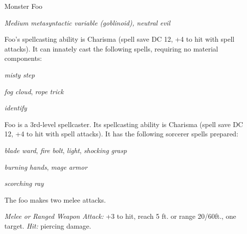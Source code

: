\documentclass[10pt,twoside,twocolumn,openany,bg=full,nomultitoc]{dndbook}
\begin{document}
\begin{monsterbox}{Monster Foo}
\begin{hangingpar}
\textit{Medium metasyntactic variable (goblinoid), neutral evil}
\end{hangingpar}
\dndline%
\basics[%
armorclass = 9 (12 with \emph{mage armor}),
hitpoints = \dice{3d8+3},
speed = {30 ft., fly 30 ft.},
]
\dndline%
\stats[%
CON = \stat{13},
STR = \stat{12},
DEX = \stat{8},
INT = \stat{10},
WIS = \stat{14},
CHA = \stat{15},
]
\dndline%
\details[%
senses = {darkvision 60ft., passive Perception 10},
languages = {Common, Goblin},
challenge = {1},
]
\dndline
\begin{monsteraction}
Foo's spellcasting ability is Charisma (spell save DC 12, +4 to hit with spell attacks). It can innately cast the following spells, requiring no material components:
\end{monsteraction}
\begin{monsteraction}[At will]
\emph{misty step}
\end{monsteraction}
\begin{monsteraction}[3/day]
\emph{fog cloud}, \emph{rope trick}
\end{monsteraction}
\begin{monsteraction}[1/day]
\emph{identify}
\end{monsteraction}
\begin{monsteraction}[Spellcasting]
Foo is a 3rd-level spellcaster. Its spellcasting ability is Charisma (spell save DC 12, +4 to hit with spell attacks). It has the following sorcerer spells prepared:
\end{monsteraction}
\begin{monsteraction}[At will]
\emph{blade ward}, \emph{fire bolt}, \emph{light}, \emph{shocking grasp}
\end{monsteraction}
\begin{monsteraction}
\emph{burning hands}, \emph{mage armor}
\end{monsteraction}
\begin{monsteraction}
\emph{scorching ray}
\end{monsteraction}
\begin{monsteraction}[Multiattack]
The foo makes two melee attacks.
\end{monsteraction}
\begin{monsteraction}[Dagger]
\emph{Melee or Ranged Weapon Attack:} +3 to hit, reach 5 ft. or range 20/60ft., one target. \emph{Hit:}  piercing damage.

\end{monsteraction}
\end{monsterbox}
\end{document}
